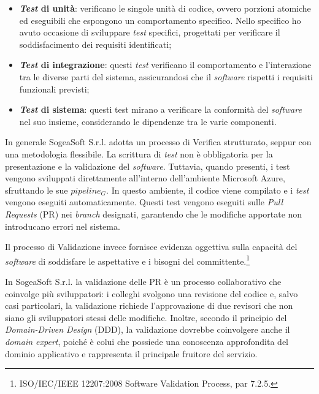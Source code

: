         \begin{itemize}
        \item \textbf{\textit{Test} di unità}: verificano le singole unità di codice, ovvero porzioni atomiche ed eseguibili che espongono un comportamento specifico. Nello specifico ho avuto occasione di sviluppare \textit{test} specifici, progettati per verificare il soddisfacimento dei requisiti identificati;

        \item \textbf{\textit{Test} di integrazione}: questi \textit{test} verificano il comportamento e l'interazione tra le diverse parti del sistema, assicurandosi che il \textit{software} rispetti i requisiti funzionali previsti;

        \item \textbf{\textit{Test} di sistema}: questi test mirano a verificare la conformità del \textit{software} nel suo insieme, considerando le dipendenze tra le varie componenti.
        \end{itemize}

        \noindent In generale SogeaSoft S.r.l. adotta un processo di Verifica strutturato, seppur con una metodologia flessibile. La scrittura di \textit{test} non è obbligatoria per la presentazione e la validazione del \textit{software}. Tuttavia, quando presenti, i test vengono sviluppati direttamente all’interno dell'ambiente Microsoft Azure, sfruttando le sue \textit{$pipeline_G$}. In questo ambiente, il codice viene compilato e i \textit{test} vengono eseguiti automaticamente. Questi test vengono eseguiti sulle \textit{Pull Requests} (PR) nei \textit{branch} designati, garantendo che le modifiche apportate non introducano errori nel sistema. 
        
        \noindent Il processo di Validazione invece fornisce evidenza oggettiva sulla capacità del \textit{software} di soddisfare le aspettative e i bisogni del committente.\footnote{ISO/IEC/IEEE 12207:2008 Software Validation Process, par 7.2.5.}

        \noindent In SogeaSoft S.r.l. la validazione delle PR è un processo collaborativo che coinvolge più sviluppatori: i colleghi svolgono una revisione del codice e, salvo casi particolari, la validazione richiede l’approvazione di due revisori che non siano gli sviluppatori stessi delle modifiche. Inoltre, secondo il principio del \textit{Domain-Driven Design} (DDD), la validazione dovrebbe coinvolgere anche il \textit{domain expert}, poiché è colui che possiede una conoscenza approfondita del dominio applicativo e rappresenta il principale fruitore del servizio.
        
